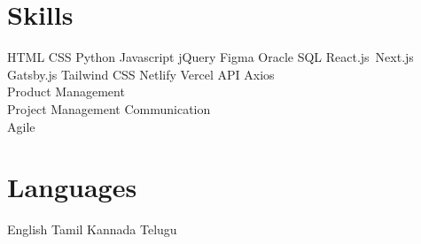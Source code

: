 \documentclass[]{deedy-resume-openfont}
\begin{document}
\begin{minipage}[t]{0.33\textwidth}

\section{Skills}
\textbullet{} HTML \textbullet{} CSS \textbullet{} Python \textbullet{} Javascript 
\textbullet{}jQuery \textbullet{} Figma \textbullet{} Oracle SQL \textbullet{} React.js\ 
Next.js \textbullet{} Gatsby.js \textbullet{} Tailwind CSS \textbullet{} Netlify  \textbullet{} Vercel 
\textbullet{}API \textbullet{} Axios \\\textbullet{} Product Management \\ \textbullet{} Project Management \textbullet{} Communication \\ \textbullet{} Agile
\sectionsep
\section{Languages} 
\textbullet{} English \textbullet{} Tamil \textbullet{} Kannada \textbullet{} Telugu

%
%

\end{minipage} 
\hfill
\end{document}
